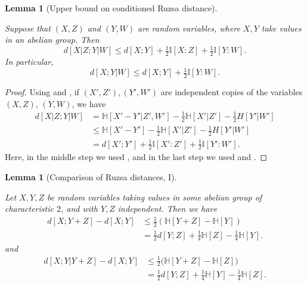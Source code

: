 \documentclass[10pt,a4paper]{article}
\newtheorem{lemma}[theorem]{Lemma}
\newcommand{\lean}[1]{}
\newcommand{\uses}[1]{}
\newcommand{\leanok}{}
\newcommand{\bbH}{\mathbb{H}}
\newcommand{\bbI}{\mathbb{I}}
\begin{document}
\begin{lemma}[Upper bound on conditioned Ruzsa distance]\label{cond-dist-fact}
  \uses{cond-dist-def, information-def}
  \lean{condRuzsaDist_le, condRuzsaDist_le'}\leanok
  Suppose that $(X, Z)$ and $(Y, W)$ are random variables, where $X, Y$ take values in an abelian group. Then
  \[   d[X  | Z;Y | W] \leq d[X ; Y] + \tfrac{1}{2}  \bbI[X : Z] + \tfrac{1}{2}  \bbI[Y : W].\]
  In particular,
  \[   d[X ;Y | W] \leq d[X ; Y] + \tfrac{1}{2}  \bbI[Y : W].\]
\end{lemma}

\begin{proof}
\uses{cond-dist-alt, independent-exist, cond-reduce}\leanok
Using  and , if $(X',Z'), (Y',W')$ are independent copies of the variables $(X,Z)$, $(Y,W)$, we have
\begin{align*}
  d[X  | Z; Y | W]&= \bbH[X'-Y'|Z',W'] - \tfrac{1}{2} \bbH[X'|Z'] - \tfrac{1}{2}H[Y'|W'] \\
                       &\le \bbH[X'-Y']- \tfrac{1}{2} \bbH[X'|Z'] - \tfrac{1}{2}H[Y'|W'] \\
                       &= d[X';Y'] + \tfrac{1}{2}  \bbI[X' : Z'] + \tfrac{1}{2}  \bbI[Y' : W'].
\end{align*}
Here, in the middle step we used , and in the last step we used  and .
\end{proof}

\begin{lemma}[Comparison of Ruzsa distances, I]\label{first-useful}
  \lean{condRuzsaDist_diff_le, condRuzsaDist_diff_le', condRuzsaDist_diff_le'', condRuzsaDist_diff_le'''}\leanok
  Let $X, Y, Z$ be random variables taking values in some abelian group of characteristic $2$, and with $Y, Z$ independent. Then we have
  \begin{align}\nonumber d[X ; Y + Z] -d[X ; Y] &  \leq \tfrac{1}{2} (\bbH[Y+ Z] - \bbH[Y]) \\ & = \tfrac{1}{2} d[Y; Z] + \tfrac{1}{4} \bbH[Z] - \tfrac{1}{4} \bbH[Y]. \label{lem51-a} \end{align}
  and
  \begin{align}\nonumber
  d[X ;Y|Y+ Z] - d[X ;Y] & \leq \tfrac{1}{2} \bigl(\bbH[Y+ Z] - \bbH[Z]\bigr) \\ & = \tfrac{1}{2} d[Y;Z] + \tfrac{1}{4} \bbH[Y] - \tfrac{1}{4} \bbH[Z].
    \label{ruzsa-3}
  \end{align}
  \end{lemma}
\end{document}
